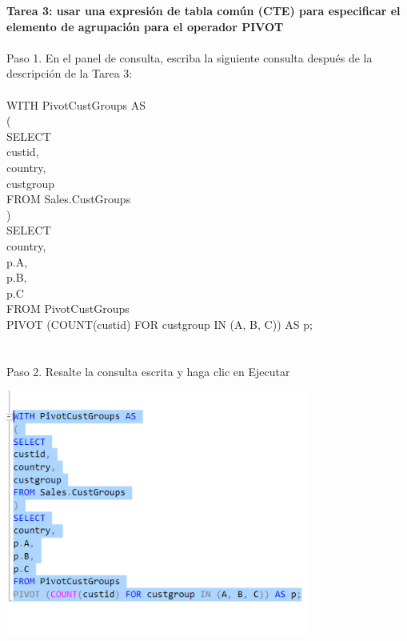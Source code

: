 \begin{flushleft}
\textbf{Tarea 3: usar una expresión de tabla común (CTE) para especificar el elemento de agrupación para el operador PIVOT}
\textbf{}\\
\textbf{}\\

Paso 1. En el panel de consulta, escriba la siguiente consulta después de la descripción de la Tarea 3:
\textbf{}\\
\textbf{}\\
WITH PivotCustGroups AS\\
(\\
SELECT\\
custid,\\
country,\\
custgroup\\
FROM Sales.CustGroups\\
)\\
SELECT\\
country,\\
p.A,\\
p.B,\\
p.C\\
FROM PivotCustGroups\\
PIVOT (COUNT(custid) FOR custgroup IN (A, B, C)) AS p;\\
\textbf{}\\
\textbf{}\\
Paso 2. Resalte la consulta escrita y haga clic en Ejecutar
\begin{center}
	\includegraphics[width=10cm]{./Imagenes/3img1} 
	\end{center}


\end{flushleft}
